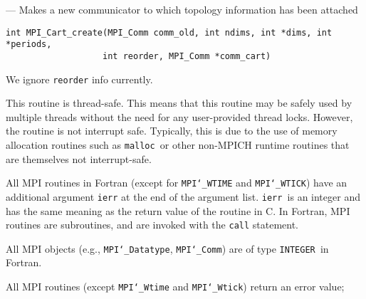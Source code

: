 \startmanpage
{}
--- Makes a new communicator to which topology information has been attached 
\startvb\begin{verbatim}
int MPI_Cart_create(MPI_Comm comm_old, int ndims, int *dims, int *periods, 
                   int reorder, MPI_Comm *comm_cart)

\end{verbatim}
\endvb

\par
{}
\par
{}
We ignore {\tt reorder} info currently.
\par
{}
\par
This routine is thread-safe.  This means that this routine may be
safely used by multiple threads without the need for any user-provided
thread locks.  However, the routine is not interrupt safe.  Typically,
this is due to the use of memory allocation routines such as {\tt malloc
}or other non-MPICH runtime routines that are themselves not interrupt-safe.
\par
{}
All MPI routines in Fortran (except for {\tt MPI{\tt \char`\_}WTIME} and {\tt MPI{\tt \char`\_}WTICK}) have
an additional argument {\tt ierr} at the end of the argument list.  {\tt ierr
}is an integer and has the same meaning as the return value of the routine
in C.  In Fortran, MPI routines are subroutines, and are invoked with the
{\tt call} statement.
\par
All MPI objects (e.g., {\tt MPI{\tt \char`\_}Datatype}, {\tt MPI{\tt \char`\_}Comm}) are of type {\tt INTEGER
}in Fortran.
\par
{}
\par
All MPI routines (except {\tt MPI{\tt \char`\_}Wtime} and {\tt MPI{\tt \char`\_}Wtick}) return an error value;
